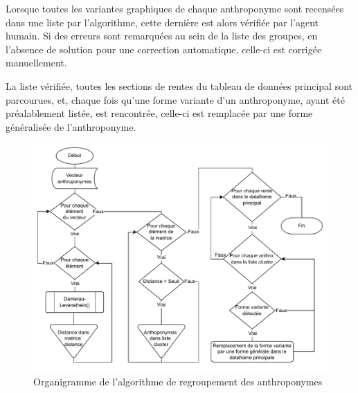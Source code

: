 Lorsque toutes les variantes graphiques de chaque anthroponyme sont recensées dans une liste par l'algorithme, cette dernière est alors vérifiée par l'agent humain. Si des erreurs sont remarquées au sein de la liste des groupes, en l'absence de solution pour une correction automatique, celle-ci est corrigée manuellement.

La liste vérifiée, toutes les sections de rentes du tableau de données principal sont parcourues, et, chaque fois qu'une forme variante d'un anthroponyme, ayant été préalablement listée, est rencontrée, celle-ci est  remplacée par une forme généralisée de l'anthroponyme. 

\begin{figure} %
    \centering
    \includegraphics[scale=0.75]{2.Methods/Img/clustering.drawio.pdf} 
    \caption{Organigramme de l'algorithme de regroupement des anthroponymes}
    \label{schemaClustering}
\end{figure}


